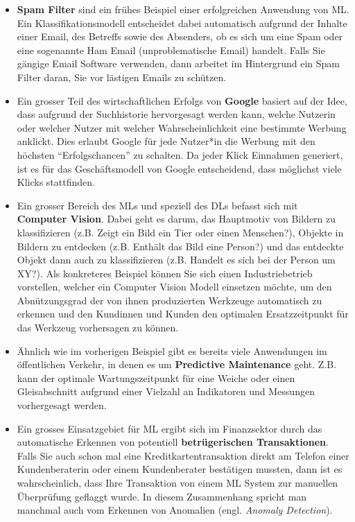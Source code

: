 \documentclass[
]{book}
\providecommand{\tightlist}{%
  \setlength{\itemsep}{0pt}\setlength{\parskip}{0pt}}
\begin{document}
\begin{itemize}
\tightlist
\item
  \textbf{Spam Filter} sind ein frühes Beispiel einer erfolgreichen Anwendung von ML. Ein Klassifikationsmodell entscheidet dabei automatisch aufgrund der Inhalte einer Email, des Betreffs sowie des Absenders, ob es sich um eine Spam oder eine sogenannte Ham Email (unproblematische Email) handelt. Falls Sie gängige Email Software verwenden, dann arbeitet im Hintergrund ein Spam Filter daran, Sie vor lästigen Emails zu schützen.
\item
  Ein grosser Teil des wirtschaftlichen Erfolgs von \textbf{Google} basiert auf der Idee, dass aufgrund der Suchhistorie hervorgesagt werden kann, welche Nutzerin oder welcher Nutzer mit welcher Wahrscheinlichkeit eine bestimmte Werbung anklickt. Dies erlaubt Google für jede Nutzer*in die Werbung mit den höchsten ``Erfolgschancen'' zu schalten. Da jeder Klick Einnahmen generiert, ist es für das Geschäftsmodell von Google entscheidend, dass möglichst viele Klicks stattfinden.
\item
  Ein grosser Bereich des MLs und speziell des DLs befasst sich mit \textbf{Computer Vision}. Dabei geht es darum, das Hauptmotiv von Bildern zu klassifizieren (z.B. Zeigt ein Bild ein Tier oder einen Menschen?), Objekte in Bildern zu entdecken (z.B. Enthält das Bild eine Person?) und das entdeckte Objekt dann auch zu klassifizieren (z.B. Handelt es sich bei der Person um XY?). Als konkreteres Beispiel können Sie sich einen Industriebetrieb vorstellen, welcher ein Computer Vision Modell einsetzen möchte, um den Abnützungsgrad der von ihnen produzierten Werkzeuge automatisch zu erkennen und den Kundinnen und Kunden den optimalen Ersatzzeitpunkt für das Werkzeug vorhersagen zu können.
\item
  Ähnlich wie im vorherigen Beispiel gibt es bereits viele Anwendungen im öffentlichen Verkehr, in denen es um \textbf{Predictive Maintenance} geht. Z.B. kann der optimale Wartungszeitpunkt für eine Weiche oder einen Gleisabschnitt aufgrund einer Vielzahl an Indikatoren und Messungen vorhergesagt werden.
\item
  Ein grosses Einsatzgebiet für ML ergibt sich im Finanzsektor durch das automatische Erkennen von potentiell \textbf{betrügerischen Transaktionen}. Falls Sie auch schon mal eine Kreditkartentransaktion direkt am Telefon einer Kundenberaterin oder einem Kundenberater bestätigen mussten, dann ist es wahrscheinlich, dass Ihre Transaktion von einem ML System zur manuellen Überprüfung geflaggt wurde. In diesem Zusammenhang spricht man manchmal auch vom Erkennen von Anomalien (engl. \emph{Anomaly Detection}).

\end{itemize}
\end{document}
